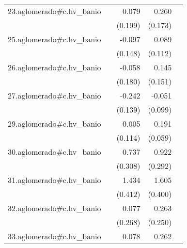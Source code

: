 {\begin{longtable}{l*{4}{D{.}{.}{-1}}}
\addlinespace
23.aglomerado#c.hv\_banio&                     &       0.079         &       0.260         &                     \\
            &                     &     (0.199)         &     (0.173)         &                     \\
\addlinespace
25.aglomerado#c.hv\_banio&                     &      -0.097         &       0.089         &                     \\
            &                     &     (0.148)         &     (0.112)         &                     \\
\addlinespace
26.aglomerado#c.hv\_banio&                     &      -0.058         &       0.145         &                     \\
            &                     &     (0.180)         &     (0.151)         &                     \\
\addlinespace
27.aglomerado#c.hv\_banio&                     &      -0.242         &      -0.051         &                     \\
            &                     &     (0.139)         &     (0.099)         &                     \\
\addlinespace
29.aglomerado#c.hv\_banio&                     &       0.005         &       0.191\sym{**} &                     \\
            &                     &     (0.114)         &     (0.059)         &                     \\
\addlinespace
30.aglomerado#c.hv\_banio&                     &       0.737\sym{*}  &       0.922\sym{**} &                     \\
            &                     &     (0.308)         &     (0.292)         &                     \\
\addlinespace
31.aglomerado#c.hv\_banio&                     &       1.434\sym{***}&       1.605\sym{***}&                     \\
            &                     &     (0.412)         &     (0.400)         &                     \\
\addlinespace
32.aglomerado#c.hv\_banio&                     &       0.077         &       0.263         &                     \\
            &                     &     (0.268)         &     (0.250)         &                     \\
\addlinespace
33.aglomerado#c.hv\_banio&                     &       0.078         &       0.262\sym{***}&                     \\

\end{longtable}}
